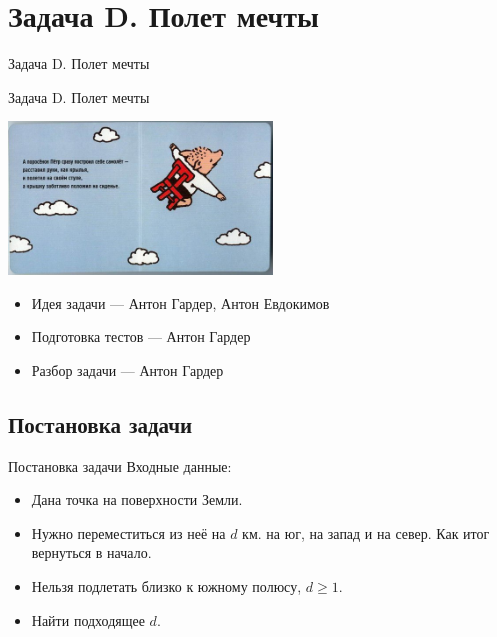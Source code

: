 \section{Задача D. Полет мечты}

\begin{frame}[t]{Задача D. Полет мечты}

  \begin{center}
    \LARGE Задача D. Полет мечты
  \end{center}
  \begin{center}
	  \includegraphics[width=7cm]{pics/dreamrun.jpg}
  \end{center}
\end{frame}

\begin{frame}[t]{}
  \vspace{3cm}
  \begin{itemize}
    \item Идея задачи --- Антон Гардер, Антон Евдокимов
    \item Подготовка тестов --- Антон Гардер
    \item Разбор задачи --- Антон Гардер
  \end{itemize}
\end{frame}

\subsection{Постановка задачи}

\begin{frame}[t]{Постановка задачи}
Входные данные:
\begin{itemize}
    \item Дана точка на поверхности Земли.
    \item Нужно переместиться из неё на $d$ км. на юг, на запад и на север. Как итог вернуться в начало.
    \item Нельзя подлетать близко к южному полюсу, $d \ge 1$.
    \item Найти подходящее $d$.
\end{itemize}
\end{frame}

